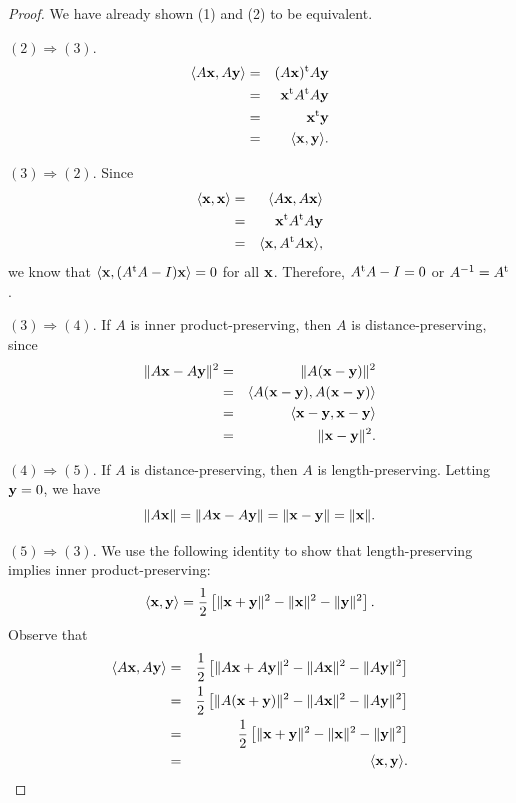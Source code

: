  
\begin{proof}
We have already shown (1) and (2) to be equivalent.
 
$(2) \Rightarrow (3)$.
\begin{eqnarray*}
\langle A{\bold x}, A{\bold y} \rangle
& = &
(A {\bold x})^{\rm t} A {\bold y} \\
& = &
{\bold x}^{\rm t} A^{\rm t} A {\bold y} \\
& = &
{\bold x}^{\rm t} {\bold y} \\
& = &
\langle {\bold x}, {\bold y} \rangle.
\end{eqnarray*}
 
$(3) \Rightarrow (2)$.
Since
\begin{eqnarray*}
\langle {\bold x}, {\bold x} \rangle
& = &
\langle A{\bold x}, A{\bold x} \rangle \\
& = &
{\bold x}^{\rm t} A^{\rm t} A {\bold y} \\
& = &
\langle {\bold x}, A^{\rm t} A{\bold x} \rangle,
\end{eqnarray*}
we know that $\langle {\bold x}, (A^{\rm t} A - I){\bold x} \rangle =
0$ for all ${\bold x}$.  Therefore, $A^{\rm t} A -I = 0$ or $A^{-1} =
A^{\rm t}$. 
 
 
$(3) \Rightarrow (4)$.
If $A$ is inner product-preserving, then $A$ is distance-preserving,
since 
\begin{eqnarray*}
\| A{\bold x} - A{\bold y} \|^2
& = &
\| A({\bold x} - {\bold y}) \|^2 \\
& = &
\langle
A({\bold x} - {\bold y}), A({\bold x} - {\bold y})
\rangle \\
& = &
\langle
{\bold x} - {\bold y}, {\bold x} - {\bold y}
\rangle \\
& = &
\| {\bold x} - {\bold y} \|^2.
\end{eqnarray*}
 
 
$(4) \Rightarrow (5)$.
If $A$ is distance-preserving, then $A$ is length-preserving. Letting
${\bold y} = 0$, we have
\[
\| A{\bold x}\|
= \| A{\bold x}- A{\bold y} \|
= \| {\bold x}- {\bold y} \|
= \| {\bold x} \|.
\]
 
 
$(5) \Rightarrow (3)$.
We use the following identity to show that length-preserving implies
inner product-preserving: 
\[
\langle {\bold x}, {\bold y} \rangle
=
\frac{1}{2}
\left[
\|{\bold x} +{\bold y}\|^2 -
 \|{\bold x}\|^2 - \|{\bold y}\|^2
\right].
\]
Observe that
\begin{eqnarray*}
\langle A {\bold x}, A {\bold y} \rangle
& = &
\frac{1}{2}
\left[
\|A {\bold x} + A {\bold y} \|^2
- \|A {\bold x} \|^2 -  \|A {\bold y} \|^2
\right] \\
& = &
\frac{1}{2}
\left[
\|A ( {\bold x} + {\bold y} ) \|^2
- \|A {\bold x} \|^2 -  \|A {\bold y} \|^2
\right] \\
& = &
\frac{1}{2}
\left[
\|{\bold x} + {\bold y}\|^2
- \|{\bold x}\|^2 - \|{\bold y}\|^2
\right] \\
& = &
\langle {\bold x}, {\bold y} \rangle.
\end{eqnarray*}
\end{proof}
 

